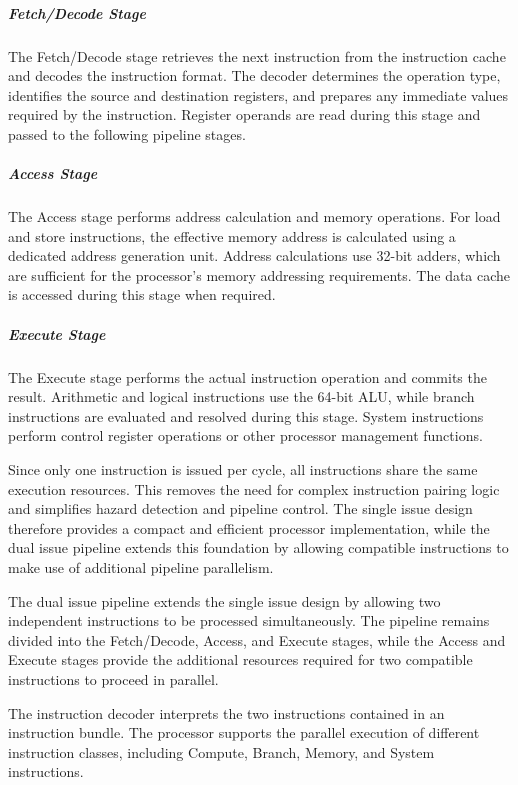 \subparagraph{Fetch/Decode Stage}
The Fetch/Decode stage retrieves the next instruction from the instruction cache and decodes the instruction format. The decoder determines the operation type, identifies the source and destination registers, and prepares any immediate values required by the instruction. Register operands are read during this stage and passed to the following pipeline stages.

\subparagraph{Access Stage}
The Access stage performs address calculation and memory operations. For load and store instructions, the effective memory address is calculated using a dedicated address generation unit. Address calculations use 32-bit adders, which are sufficient for the processor's memory addressing requirements. The data cache is accessed during this stage when required.

\subparagraph{Execute Stage}
The Execute stage performs the actual instruction operation and commits the result. Arithmetic and logical instructions use the 64-bit ALU, while branch instructions are evaluated and resolved during this stage. System instructions perform control register operations or other processor management functions.

Since only one instruction is issued per cycle, all instructions share the same execution resources. This removes the need for complex instruction pairing logic and simplifies hazard detection and pipeline control. The single issue design therefore provides a compact and efficient processor implementation, while the dual issue pipeline extends this foundation by allowing compatible instructions to make use of additional pipeline parallelism.



The dual issue pipeline extends the single issue design by allowing two independent instructions to be processed simultaneously. The pipeline remains divided into the Fetch/Decode, Access, and Execute stages, while the Access and Execute stages provide the additional resources required for two compatible instructions to proceed in parallel.


The instruction decoder interprets the two instructions contained in an instruction bundle. The processor supports the parallel execution of different instruction classes, including Compute, Branch, Memory, and System instructions.

